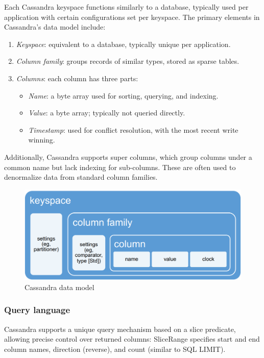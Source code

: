 Each Cassandra keyspace functions similarly to a database, typically used per application with certain configurations set per keyspace. 
The primary elements in Cassandra's data model include:
\begin{enumerate}
    \item \textit{Keyspace}: equivalent to a database, typically unique per application.
    \item \textit{Column family}: groups records of similar types, stored as sparse tables.
    \item \textit{Columns}: each column has three parts:
        \begin{itemize}
            \item \textit{Name}: a byte array used for sorting, querying, and indexing.
            \item \textit{Value}: a byte array; typically not queried directly.
            \item \textit{Timestamp}: used for conflict resolution, with the most recent write winning.
        \end{itemize}
\end{enumerate}
Additionally, Cassandra supports super columns, which group columns under a common name but lack indexing for sub-columns. These are often used to denormalize data from standard column families.
\begin{figure}[H]
    \centering
    \includegraphics[width=0.75\linewidth]{images/cas.png}
    \caption{Cassandra data model}
\end{figure}

\subsubsection{Query language}
Cassandra supports a unique query mechanism based on a slice predicate, allowing precise control over returned columns:
SliceRange specifies start and end column names, direction (reverse), and count (similar to SQL LIMIT).

